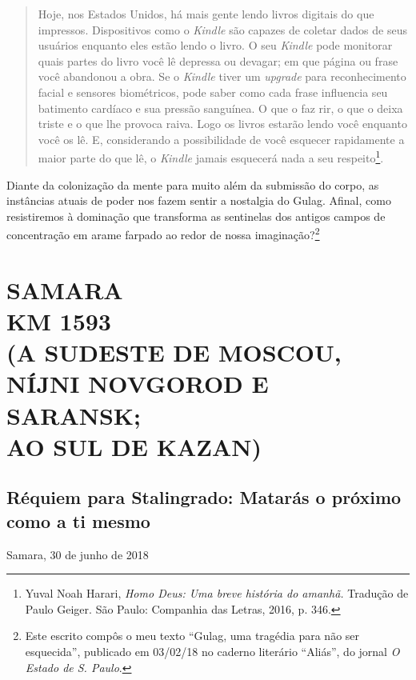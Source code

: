 \begin{quote}
Hoje, nos Estados Unidos, há mais gente lendo livros digitais do que
impressos. Dispositivos como o \emph{Kindle} são capazes de coletar
dados de seus usuários enquanto eles estão lendo o livro. O seu
\emph{Kindle} pode monitorar quais partes do livro você lê depressa ou
devagar; em que página ou frase você abandonou a obra. Se o
\emph{Kindle} tiver um \emph{upgrade} para reconhecimento facial e
sensores biométricos, pode saber como cada frase influencia seu
batimento cardíaco e sua pressão sanguínea. O que o faz rir, o que o
deixa triste e o que lhe provoca raiva. Logo os livros estarão lendo
você enquanto você os lê. E, considerando a possibilidade de você
esquecer rapidamente a maior parte do que lê, o \emph{Kindle} jamais
esquecerá nada a seu respeito\footnote{Yuval Noah Harari, \emph{Homo
  Deus: Uma breve história do amanhã.} Tradução de Paulo Geiger. São
  Paulo: Companhia das Letras, 2016, p. 346.}.
\end{quote}

Diante da colonização da mente para muito além da submissão do corpo, as
instâncias atuais de poder nos fazem sentir a nostalgia do Gulag.
Afinal, como resistiremos à dominação que transforma as sentinelas dos
antigos campos de concentração em arame farpado ao redor de nossa
imaginação?\footnote{Este escrito compôs o meu texto ``Gulag, uma
  tragédia para não ser esquecida'', publicado em 03/02/18 no caderno
  literário ``Aliás'', do jornal \emph{O Estado de S. Paulo}.}

\newpage
{}
\part*{SAMARA\\KM 1593\\(A SUDESTE DE MOSCOU,\\NÍJNI NOVGOROD E SARANSK;\\AO SUL DE KAZAN)}

\chapter*{Réquiem para Stalingrado: Matarás o próximo como a ti mesmo}

\begin{flushright}
Samara, 30 de junho de 2018
\end{flushright}

